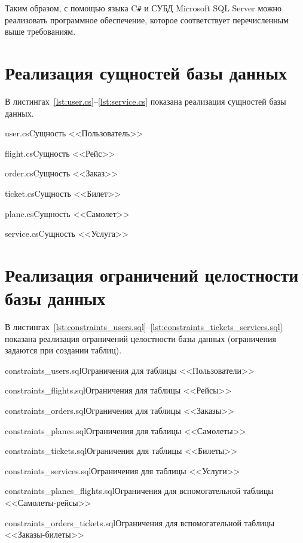 \documentclass{bmstu}
\begin{document}
Таким образом, с помощью языка C\texttt{\#} и СУБД Microsoft SQL Server можно реализовать программное обеспечение, которое соответствует перечисленным выше требованиям.

\section{Реализация сущностей базы данных}

В листингах~\ref{lst:user.cs}--\ref{lst:service.cs} показана реализация сущностей базы данных.

{user.cs}{Cущность <<Пользователь>>}

{flight.cs}{Cущность <<Рейс>>}

\pagebreak
{}
{order.cs}{Cущность <<Заказ>>}

{ticket.cs}{Cущность <<Билет>>}

{plane.cs}{Cущность <<Самолет>>}

\pagebreak
{}
{service.cs}{Cущность <<Услуга>>}

\section{Реализация ограничений целостности базы данных}

В листингах~\ref{lst:constraints_users.sql}--\ref{lst:constraints_tickets_services.sql} показана реализация ограничений целостности базы данных (ограничения задаются при создании таблиц).

{constraints_users.sql}{Ограничения для таблицы <<Пользователи>>}

\pagebreak
{}
{constraints_flights.sql}{Ограничения для таблицы <<Рейсы>>}

{constraints_orders.sql}{Ограничения для таблицы <<Заказы>>}

{constraints_planes.sql}{Ограничения для таблицы <<Самолеты>>}

\pagebreak
{}
{constraints_tickets.sql}{Ограничения для таблицы <<Билеты>>}

{constraints_services.sql}{Ограничения для таблицы <<Услуги>>}

\pagebreak
{}
{constraints_planes_flights.sql}{Ограничения для вспомогательной таблицы <<Самолеты-рейсы>>}

{constraints_orders_tickets.sql}{Ограничения для вспомогательной таблицы <<Заказы-билеты>>}
\end{document}

